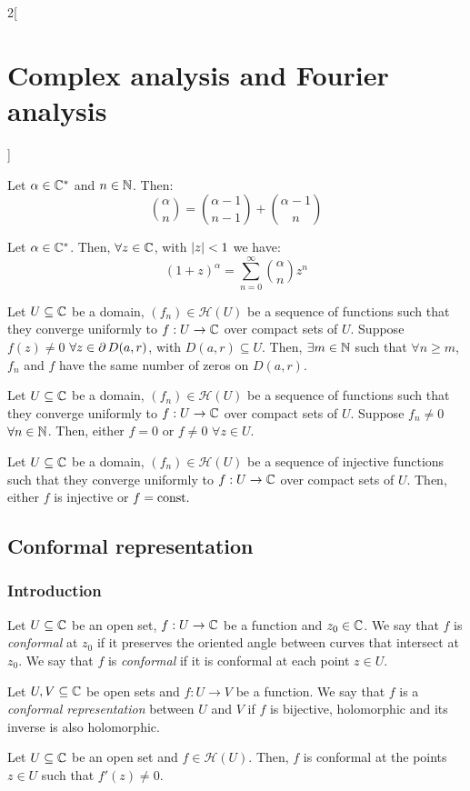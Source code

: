 \documentclass[../../../main.tex]{subfiles}
\begin{document}
\begin{multicols}{2}[\section{Complex analysis and Fourier analysis}]
\begin{proposition}
    Let $\alpha\in\mathbb{C}^*$ and $n\in\mathbb{N}$. Then:
    $$\binom{\alpha}{n}=\binom{\alpha-1}{n-1}+\binom{\alpha-1}{n}$$
  \end{proposition}
  \begin{theorem}
    Let $\alpha\in\mathbb{C}^*$. Then, $\forall z\in\mathbb{C}$, with $\abs{z}<1$ we have: $${(1+z)}^\alpha=\sum_{n=0}^\infty\binom{\alpha}{n}z^n$$
  \end{theorem}
  \begin{theorem}
    Let $U\subseteq \mathbb{C}$ be a domain, $(f_n)\in\mathcal{H}(U)$ be a sequence of functions such that they converge uniformly to $f:U\rightarrow\mathbb{C}$ over compact sets of $U$. Suppose $f(z)\ne 0$ $\forall z\in\operatorname{\partial}{D(a,r)}$, with $D(a,r)\subseteq U$. Then, $\exists m\in\mathbb{N}$ such that $\forall n\geq m$, $f_n$ and $f$ have the same number of zeros on $D(a,r)$.
  \end{theorem}
  \begin{corollary}
    Let $U\subseteq \mathbb{C}$ be a domain, $(f_n)\in\mathcal{H}(U)$ be a sequence of functions such that they converge uniformly to $f:U\rightarrow\mathbb{C}$ over compact sets of $U$. Suppose $f_n\ne 0$ $\forall n\in\mathbb{N}$. Then, either $f=0$ or $f\ne 0$ $\forall z\in U$.
  \end{corollary}
  \begin{corollary}
    Let $U\subseteq \mathbb{C}$ be a domain, $(f_n)\in\mathcal{H}(U)$ be a sequence of injective functions such that they converge uniformly to $f:U\rightarrow\mathbb{C}$ over compact sets of $U$. Then, either $f$ is injective or $f=\text{const.}$
  \end{corollary}
  \subsection{Conformal representation}
  \subsubsection{Introduction}
  \begin{definition}
    Let $U\subseteq \mathbb{C}$ be an open set, $f:U\rightarrow\mathbb{C}$ be a function and $z_0\in\mathbb{C}$. We say that $f$ is \emph{conformal} at $z_0$ if it preserves the oriented angle between curves that intersect at $z_0$. We say that $f$ is \emph{conformal} if it is conformal at each point $z\in U$.
  \end{definition}
  \begin{definition}
    Let $U,V\subseteq \mathbb{C}$ be open sets and $f:U\rightarrow V$ be a function. We say that $f$ is a \emph{conformal representation} between $U$ and $V$ if $f$ is bijective, holomorphic and its inverse is also holomorphic.
  \end{definition}
  \begin{theorem}
    Let $U\subseteq \mathbb{C}$ be an open set and $f\in\mathcal{H}(U)$. Then, $f$ is conformal at the points $z\in U$ such that $f'(z)\ne 0$.
  \end{theorem}

\end{multicols}
\end{document}
